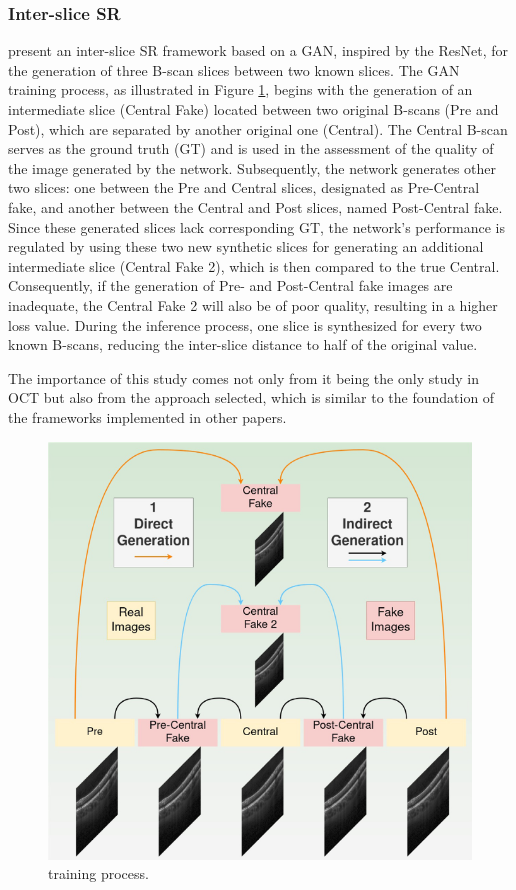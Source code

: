 \subsubsection{Inter-slice SR}

\textcite{Lopez2023} present an inter-slice SR framework based on a GAN, inspired by the ResNet, for the generation of three B-scan slices between two known slices. The GAN training process, as illustrated in Figure \ref{fig:GANGenerationFramework}, begins with the generation of an intermediate slice (Central Fake) located between two original B-scans (Pre and Post), which are separated by another original one (Central). The Central B-scan serves as the ground truth (GT) and is used in the assessment of the quality of the image generated by the network. Subsequently, the network generates other two slices: one between the Pre and Central slices, designated as Pre-Central fake, and another between the Central and Post slices, named Post-Central fake. Since these generated slices lack corresponding GT, the network's performance is regulated by using these two new synthetic slices for generating an additional intermediate slice (Central Fake 2), which is then compared to the true Central. Consequently, if the generation of Pre- and Post-Central fake images are inadequate, the Central Fake 2 will also be of poor quality, resulting in a higher loss value. During the inference process, one slice is synthesized for every two known B-scans, reducing the inter-slice distance to half of the original value.
\par
The importance of this study comes not only from it being the only study in OCT but also from the approach selected, which is similar to the foundation of the frameworks implemented in other papers. 

\begin{figure}[!ht]
	\centering
	\includegraphics[width=0.70\linewidth]{figures/GANGenerationFramework.png}
	\caption{\textcite{Lopez2023} training process.}
	\label{fig:GANGenerationFramework}
\end{figure}

